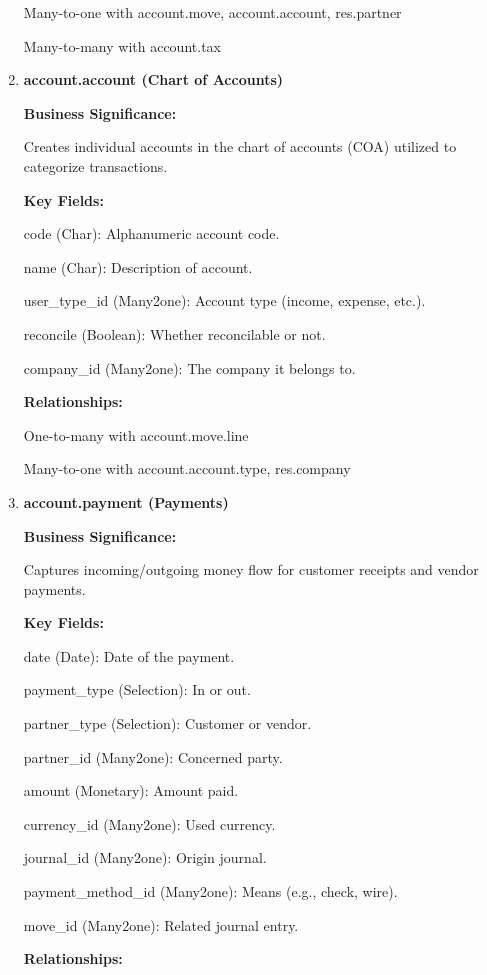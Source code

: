 \documentclass[11pt,a4paper]{article}
\begin{document}
\begin{enumerate}
    Many-to-one with account.move, account.account, res.partner

    Many-to-many with account.tax

    \item \textbf{account.account (Chart of Accounts)}
    
    \textbf{Business Significance:}

    Creates individual accounts in the chart of accounts (COA) utilized to categorize transactions.
    
    \textbf{Key Fields:}

    code (Char): Alphanumeric account code.

    name (Char): Description of account.

    user\_type\_id (Many2one): Account type (income, expense, etc.).

    reconcile (Boolean): Whether reconcilable or not.

    company\_id (Many2one): The company it belongs to.
    \medskip

    \textbf{Relationships:}

    One-to-many with account.move.line

    Many-to-one with account.account.type, res.company 

    \item \textbf{account.payment (Payments)}
    
    \textbf{Business Significance:}

    Captures incoming/outgoing money flow for customer receipts and vendor payments.
    \medskip

    \textbf{Key Fields:}

    date (Date): Date of the payment.

    payment\_type (Selection): In or out.

    partner\_type (Selection): Customer or vendor.

    partner\_id (Many2one): Concerned party.

    amount (Monetary): Amount paid.

    currency\_id (Many2one): Used currency.

    journal\_id (Many2one): Origin journal.

    payment\_method\_id (Many2one): Means (e.g., check, wire).

    move\_id (Many2one): Related journal entry.
    \medskip

    \textbf{Relationships:}


\end{enumerate}
\end{document}
